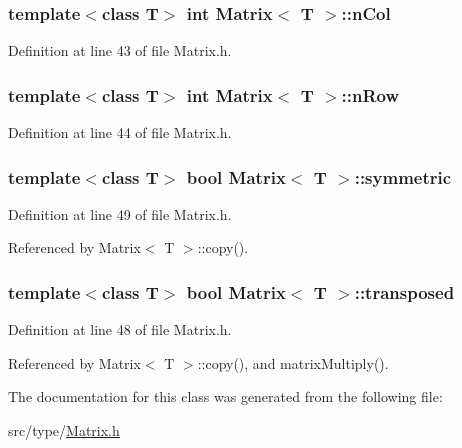 \subsubsection[{n\+Col}]{\setlength{\rightskip}{0pt plus 5cm}template$<$class T$>$ int {\bf Matrix}$<$ T $>$\+::n\+Col\hspace{0.3cm}{\ttfamily [private]}}\label{singletonMatrix_aa3b73b40cb492b1a2b73c94fc5c3e212}


Definition at line 43 of file Matrix.\+h.

\hypertarget{singletonMatrix_a18ad6163c76247e0c007c48d18e62afa}{}
\subsubsection[{n\+Row}]{\setlength{\rightskip}{0pt plus 5cm}template$<$class T$>$ int {\bf Matrix}$<$ T $>$\+::n\+Row\hspace{0.3cm}{\ttfamily [private]}}\label{singletonMatrix_a18ad6163c76247e0c007c48d18e62afa}


Definition at line 44 of file Matrix.\+h.

\hypertarget{singletonMatrix_af2bf28cc007514273c14f89975438701}{}
\subsubsection[{symmetric}]{\setlength{\rightskip}{0pt plus 5cm}template$<$class T$>$ bool {\bf Matrix}$<$ T $>$\+::symmetric}\label{singletonMatrix_af2bf28cc007514273c14f89975438701}


Definition at line 49 of file Matrix.\+h.



Referenced by Matrix$<$ T $>$\+::copy().

\hypertarget{singletonMatrix_aa9511b2f62fafa982819c9d22b4fbefc}{}
\subsubsection[{transposed}]{\setlength{\rightskip}{0pt plus 5cm}template$<$class T$>$ bool {\bf Matrix}$<$ T $>$\+::transposed}\label{singletonMatrix_aa9511b2f62fafa982819c9d22b4fbefc}


Definition at line 48 of file Matrix.\+h.



Referenced by Matrix$<$ T $>$\+::copy(), and matrix\+Multiply().



The documentation for this class was generated from the following file\+:\begin{DoxyCompactItemize}
\item 
src/type/\hyperlink{Matrix_8h}{Matrix.\+h}\end{DoxyCompactItemize}
